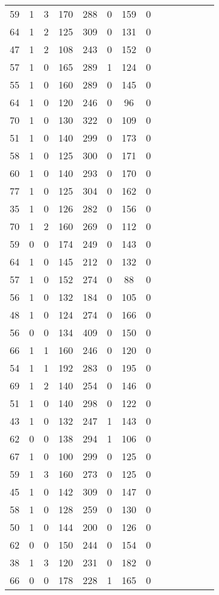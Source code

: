 \documentclass{article}
\begin{document}
\begin{longtable}{|c|c|c|c|c|c|c|c|c|c|c|c|c|c|}
59 & 1 & 3 & 170 & 288 & 0 & 159 & 0\\
64 & 1 & 2 & 125 & 309 & 0 & 131 & 0\\
47 & 1 & 2 & 108 & 243 & 0 & 152 & 0\\
57 & 1 & 0 & 165 & 289 & 1 & 124 & 0\\
55 & 1 & 0 & 160 & 289 & 0 & 145 & 0\\
64 & 1 & 0 & 120 & 246 & 0 & 96 & 0\\
70 & 1 & 0 & 130 & 322 & 0 & 109 & 0\\
51 & 1 & 0 & 140 & 299 & 0 & 173 & 0\\
58 & 1 & 0 & 125 & 300 & 0 & 171 & 0\\
60 & 1 & 0 & 140 & 293 & 0 & 170 & 0\\
77 & 1 & 0 & 125 & 304 & 0 & 162 & 0\\
35 & 1 & 0 & 126 & 282 & 0 & 156 & 0\\
70 & 1 & 2 & 160 & 269 & 0 & 112 & 0\\
59 & 0 & 0 & 174 & 249 & 0 & 143 & 0\\
64 & 1 & 0 & 145 & 212 & 0 & 132 & 0\\
57 & 1 & 0 & 152 & 274 & 0 & 88 & 0\\
56 & 1 & 0 & 132 & 184 & 0 & 105 & 0\\
48 & 1 & 0 & 124 & 274 & 0 & 166 & 0\\
56 & 0 & 0 & 134 & 409 & 0 & 150 & 0\\
66 & 1 & 1 & 160 & 246 & 0 & 120 & 0\\
54 & 1 & 1 & 192 & 283 & 0 & 195 & 0\\
69 & 1 & 2 & 140 & 254 & 0 & 146 & 0\\
51 & 1 & 0 & 140 & 298 & 0 & 122 & 0\\
43 & 1 & 0 & 132 & 247 & 1 & 143 & 0\\
62 & 0 & 0 & 138 & 294 & 1 & 106 & 0\\
67 & 1 & 0 & 100 & 299 & 0 & 125 & 0\\
59 & 1 & 3 & 160 & 273 & 0 & 125 & 0\\
45 & 1 & 0 & 142 & 309 & 0 & 147 & 0\\
58 & 1 & 0 & 128 & 259 & 0 & 130 & 0\\
50 & 1 & 0 & 144 & 200 & 0 & 126 & 0\\
62 & 0 & 0 & 150 & 244 & 0 & 154 & 0\\
38 & 1 & 3 & 120 & 231 & 0 & 182 & 0\\
66 & 0 & 0 & 178 & 228 & 1 & 165 & 0\\

\end{longtable}
\end{document}
